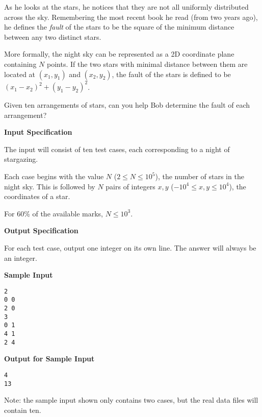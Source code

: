\documentclass[11pt]{article}
\newcommand{\heading}[1]{\vspace{0.6em} \textbf{#1}}
\begin{document}
As he looks at the stars, he notices that they are not all uniformly distributed across the sky. Remembering the most recent book he read (from two years ago), he defines the \textit{fault} of the stars to be the square of the minimum distance between any two distinct stars.

More formally, the night sky can be represented as a 2D coordinate plane containing $N$ points. If the two stars with minimal distance between them are located at $(x_1, y_1)$ and $(x_2, y_2)$, the fault of the stars is defined to be $(x_1 - x_2)^2 + (y_1 - y_2)^2$.

Given ten arrangements of stars, can you help Bob determine the fault of each arrangement?


\heading{Input Specification}

The input will consist of ten test cases, each corresponding to a night of stargazing.

Each case begins with the value $N$ ($2 \le N \le 10^5$), the number of stars in the night sky. This is followed by $N$ pairs of integers $x, y$ ($-10^4 \le x, y \le 10^4$), the coordinates of a star.

For 60\% of the available marks, $N \le 10^3$.


\heading{Output Specification}

For each test case, output one integer on its own line. The answer will always be an integer.


\heading{Sample Input}
\vspace{-\topsep}
\begin{verbatim}
2
0 0
2 0
3
0 1
4 1
2 4
\end{verbatim}

\vspace{-\topsep}
\heading{Output for Sample Input}
\vspace{-\topsep}
\begin{verbatim}
4
13
\end{verbatim}

Note: the sample input shown only contains two cases, but the real data files will contain ten.

\end{document}
